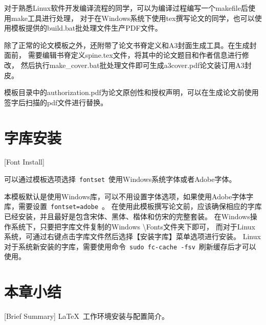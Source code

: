 对于熟悉Linux软件开发编译流程的同学，可以为编译过程编写一个makefile后使用make工具进行处理，
对于在Windows系统下使用tex撰写论文的同学，也可以使用模板提供的build.bat批处理文件生产PDF文件。

除了正常的论文模板之外，还附带了论文书脊定义和A3封面生成工具。在生成封面前，
需要编辑书脊定义spine.tex文件，将其中的论文题目和作者信息进行修改，
然后执行make\_cover.bat批处理文件即可生成a3cover.pdf论文装订用A3封皮。

模板目录中的authorization.pdf为论文原创性和授权声明，可以在生成论文前使用签字后扫描的pdf文件进行替换。

\section{字库安装}[Font Install]

可以通过模板选项选择~\texttt{fontset}~使用Windows系统字体或者Adobe字体。

本模板默认是使用Windows库，可以不用设置字体选项，如果使用Adobe字体字库，需要设置~\texttt{fontset=adobe}~。
在使用此模板撰写论文前，应该确保相应的字库已经安装，并且最好是包含宋体、黑体、楷体和仿宋的完整套装。
在Windows操作系统下，只要把字库文件复制的Windows \textbackslash Fonts文件夹下即可，
而对于Linux系统，可通过右键点击字库文件然后选择【安装字库】菜单选项进行安装。
Linux对于系统新安装的字库，需要使用命令~\texttt{sudo fc-cache -fsv}~刷新缓存后才可以使用。

\section*{本章小结}[Brief Summary]
\LaTeX{}~工作环境安装与配置简介。
